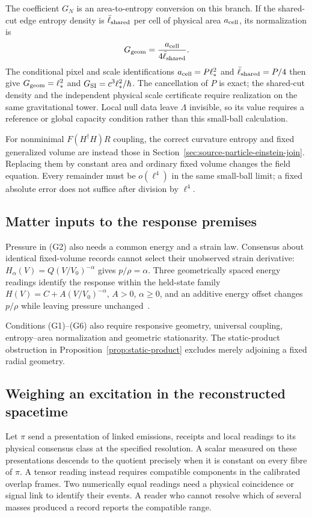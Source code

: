 \documentclass[11pt]{article}
\begin{document}
The coefficient $G_N$ is an area-to-entropy conversion on this branch.
If the shared-cut edge entropy density is $\bar\ell_{\rm shared}$ per
cell of physical area $a_{\rm cell}$, its normalization is
\[
 G_{\rm geom}=\frac{a_{\rm cell}}{4\bar\ell_{\rm shared}}.
\]
The conditional pixel and scale identifications
$a_{\rm cell}=P\ell_*^2$ and $\bar\ell_{\rm shared}=P/4$ then give
$G_{\rm geom}=\ell_*^2$ and
$G_{\rm SI}=c^3\ell_*^2/\hbar$. The cancellation of $P$ is exact;
the shared-cut density and the independent physical scale certificate require
realization on the same gravitational tower. Local null data leave
$\Lambda$ invisible, so its value requires a reference or global
capacity condition rather than this small-ball calculation.

For nonminimal $F(H^\dagger H)R$ coupling, the correct curvature entropy
and fixed generalized volume are instead those in
Section~\ref{sec:source-particle-einstein-join}. Replacing them by constant
area and ordinary fixed volume changes the field equation. Every remainder
must be $o(\ell^4)$ in the same small-ball limit; a fixed absolute error
does not suffice after division by $\ell^4$.

\subsection{Matter inputs to the response premises}
Pressure in (G2) also needs a common energy and a strain law. Consensus about
identical fixed-volume records cannot select their unobserved strain derivative:
$H_\alpha(V)=Q(V/V_0)^{-\alpha}$ gives $p/\rho=\alpha$. Three geometrically spaced
energy readings identify the response within the held-state family
$H(V)=C+A(V/V_0)^{-\alpha}$, $A>0$, $\alpha\geq0$, and an additive energy offset
changes $p/\rho$ while leaving pressure unchanged~\cite{ophobservers}.

Conditions (G1)--(G6) also require responsive geometry, universal coupling,
entropy--area normalization and geometric stationarity. The static-product
obstruction in Proposition~\ref{prop:static-product} excludes merely
adjoining a fixed radial geometry.


\subsection{Weighing an excitation in the reconstructed spacetime}
\label{sec:record-mass}

Let $\pi$ send a presentation of linked emissions, receipts and local
readings to its physical consensus class at the specified resolution.
A scalar measured on these presentations descends to the quotient
precisely when it is constant on every fibre of $\pi$. A tensor
reading instead requires compatible components in the calibrated
overlap frames. Two numerically equal readings need a physical
coincidence or signal link to identify their events. A reader who
cannot resolve which of several masses produced a record reports the
compatible range.
\end{document}
